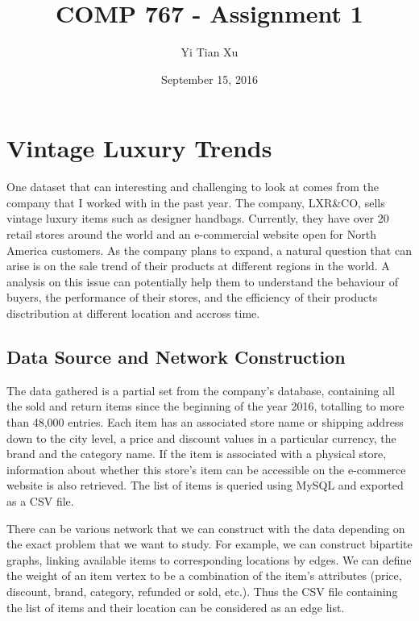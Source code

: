 \documentclass[10pt]{article}
\begin{document}
\title{COMP 767 - Assignment 1}
\author{Yi Tian Xu}
\date{September 15, 2016}
\maketitle

\section{Vintage Luxury Trends}

One dataset that can interesting and challenging to look at comes from the company that I worked with in the past year. The company, LXR{\&}CO, sells vintage luxury items such as designer handbags. Currently, they have over 20 retail stores around the world and an e-commercial website open for North America customers. As the company plans to expand, a natural question  that can arise is on the sale trend of their products at different regions in the world. A analysis on this issue can potentially help them to understand the behaviour of buyers, the performance of their stores, and the efficiency of their products disctribution at different location and accross time. 

\subsection{Data Source and Network Construction}

The data gathered is a partial set from the company's database, containing all the sold and return items since the beginning of the year 2016, totalling to more than 48,000 entries. Each item has an associated store name or shipping address down to the city level, a price and discount values in a particular currency, the brand and the category name. If the item is associated with a physical store, information about whether this store's item can be accessible on the e-commerce website is also retrieved. The list of items is queried using MySQL and exported as a CSV file. 

There can be various network that we can construct with the data depending on the exact problem that we want to study. For example, we can construct bipartite graphs, linking available items to corresponding locations by edges. We can define the weight of an item vertex to be a combination of the item's attributes (price, discount, brand, category, refunded or sold, etc.). Thus the CSV file containing the list of items and their location can be considered as an edge list. 
\end{document}
